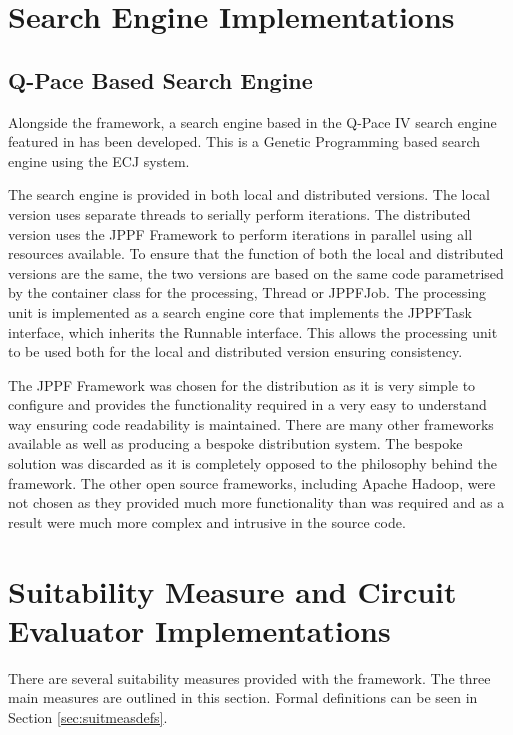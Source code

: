 \section{Search Engine Implementations}
\label{sec:provsearcheng}
\subsection{Q-Pace Based Search Engine}
Alongside the framework, a search engine based in the Q-Pace IV search engine featured in \cite{masseythesis} has been developed.
This is a Genetic Programming based search engine using the ECJ\cite{ecjtool} system.

The search engine is provided in both local and distributed versions.
The local version uses separate threads to serially perform iterations.
The distributed version uses the JPPF Framework to perform iterations in parallel using all resources available.
To ensure that the function of both the local and distributed versions are the same, the two versions are based on the same code parametrised by the container class for the processing, Thread or JPPFJob.
The processing unit is implemented as a search engine core that implements the JPPFTask interface, which inherits the Runnable interface.
This allows the processing unit to be used both for the local and distributed version ensuring consistency.

The JPPF Framework was chosen for the distribution as it is very simple to configure and provides the functionality required in a very easy to understand way ensuring code readability is maintained.
There are many other frameworks available as well as producing a bespoke distribution system.
The bespoke solution was discarded as it is completely opposed to the philosophy behind the framework.
The other open source frameworks, including Apache Hadoop\cite{apahadoop}, were not chosen as they provided much more functionality than was required and as a result were much more complex and intrusive in the source code.


\section{Suitability Measure and Circuit Evaluator Implementations}
\label{sec:provsuitmeas}

There are several suitability measures provided with the framework.
The three main measures are outlined in this section.
Formal definitions can be seen in Section \ref{sec:suitmeasdefs}.

